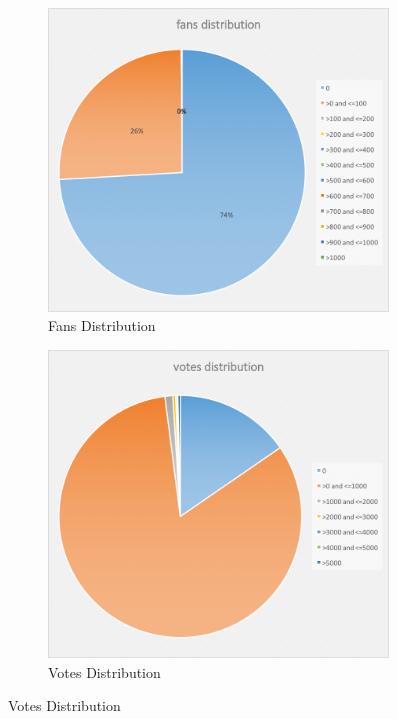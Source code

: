 \documentclass[10pt]{sig-alternate-10pt}   	%
\begin{document}
\begin{figure}[t]
\begin{subfigure}[b]{0.45\textwidth}
        \label{fig:review}
  \end{subfigure}
  \begin{subfigure}[b]{0.45\textwidth}        
        \includegraphics[width=0.99\textwidth]{figures/fans.png}
        \caption{Fans Distribution}
        \label{fig:fans}
  \end{subfigure}
  \begin{subfigure}[b]{0.45\textwidth}        
        \includegraphics[width=0.99\textwidth]{figures/votes.png}
        \caption{Votes Distribution}
        \label{fig:votes}
  \end{subfigure}  
\label{fig:dis}
\end{figure}
\end{document}
